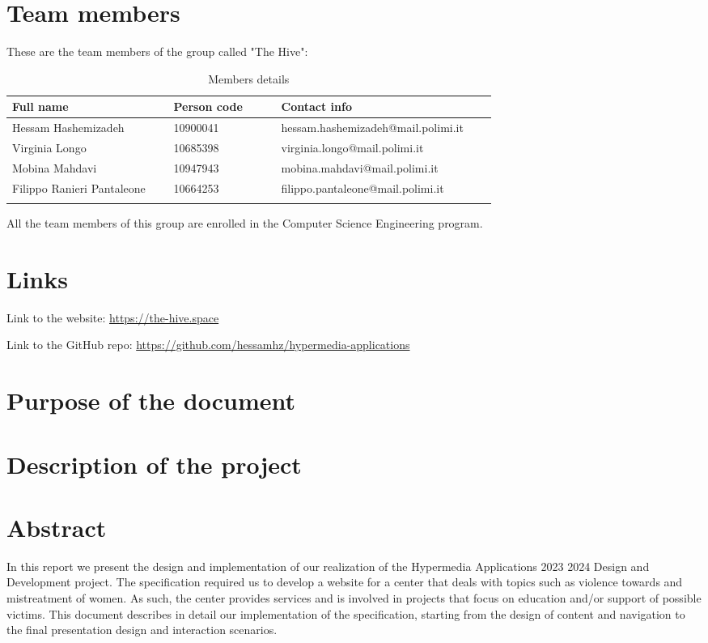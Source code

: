 \section{Team members}
These are the team members of the group called "The Hive":
\begin{longtable}
    {|m{0.3\linewidth}|m{0.2\linewidth}|m{0.4\linewidth}|}
            \hline
            \textbf{Full name} & \textbf{Person code} & \textbf{Contact info}\\
            \hline
            \endhead
                Hessam Hashemizadeh & 10900041 & hessam.hashemizadeh@mail.polimi.it \\
            \hline
                Virginia Longo & 10685398 & virginia.longo@mail.polimi.it \\
            \hline
                Mobina Mahdavi & 10947943 & mobina.mahdavi@mail.polimi.it \\
            \hline
                Filippo Ranieri Pantaleone & 10664253 & filippo.pantaleone@mail.polimi.it \\
            \hline
            \caption{Members details}
            \label{table:mem_details}
\end{longtable}


All the team members of this group are enrolled in the Computer Science Engineering program.

\section{Links}
Link to the website: \url{https://the-hive.space}

Link to the GitHub repo: \url{https://github.com/hessamhz/hypermedia-applications}

\section{Purpose of the document}

\section{Description of the project}

\section{Abstract}
In this report we present the design and implementation of our realization of the Hypermedia Applications 2023 2024 Design and Development project.
The specification required us to develop a website for a center that deals with topics such as violence towards and mistreatment of women. As such,
the center provides services and is involved in projects that focus on education and/or support of possible victims. This document describes in detail
our implementation of the specification, starting from the design of content and navigation to the final presentation design and interaction scenarios.
